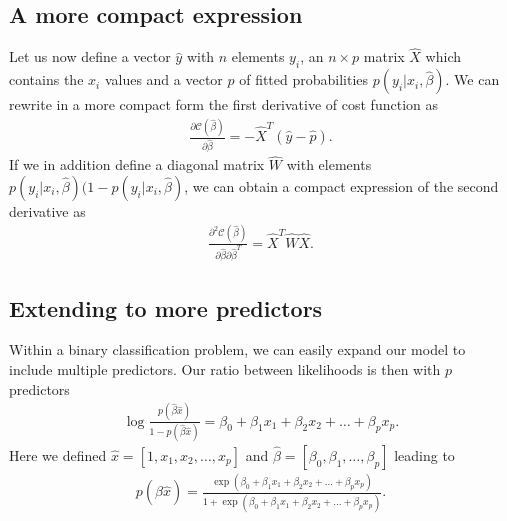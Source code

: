 \documentclass[letterpaper,10pt,english]{sphinxmanual}
\begin{document}
\subsection{A more compact expression}
\label{\detokenize{chapter5:a-more-compact-expression}}
Let us now define a vector \(\hat{y}\) with \(n\) elements \(y_i\), an
\(n\times p\) matrix \(\hat{X}\) which contains the \(x_i\) values and a
vector \(\hat{p}\) of fitted probabilities \(p(y_i\vert x_i,\hat{\beta})\). We can rewrite in a more compact form the first
derivative of cost function as
\begin{equation*}
\begin{split}
\frac{\partial \mathcal{C}(\hat{\beta})}{\partial \hat{\beta}} = -\hat{X}^T\left(\hat{y}-\hat{p}\right).
\end{split}
\end{equation*}
If we in addition define a diagonal matrix \(\hat{W}\) with elements
\(p(y_i\vert x_i,\hat{\beta})(1-p(y_i\vert x_i,\hat{\beta})\), we can obtain a compact expression of the second derivative as
\begin{equation*}
\begin{split}
\frac{\partial^2 \mathcal{C}(\hat{\beta})}{\partial \hat{\beta}\partial \hat{\beta}^T} = \hat{X}^T\hat{W}\hat{X}.
\end{split}
\end{equation*}

\subsection{Extending to more predictors}
\label{\detokenize{chapter5:extending-to-more-predictors}}
Within a binary classification problem, we can easily expand our model to include multiple predictors. Our ratio between likelihoods is then with \(p\) predictors
\begin{equation*}
\begin{split}
\log{ \frac{p(\hat{\beta}\hat{x})}{1-p(\hat{\beta}\hat{x})}} = \beta_0+\beta_1x_1+\beta_2x_2+\dots+\beta_px_p.
\end{split}
\end{equation*}
Here we defined \(\hat{x}=[1,x_1,x_2,\dots,x_p]\) and \(\hat{\beta}=[\beta_0, \beta_1, \dots, \beta_p]\) leading to
\begin{equation*}
\begin{split}
p(\hat{\beta}\hat{x})=\frac{ \exp{(\beta_0+\beta_1x_1+\beta_2x_2+\dots+\beta_px_p)}}{1+\exp{(\beta_0+\beta_1x_1+\beta_2x_2+\dots+\beta_px_p)}}.
\end{split}
\end{equation*}
\end{document}
